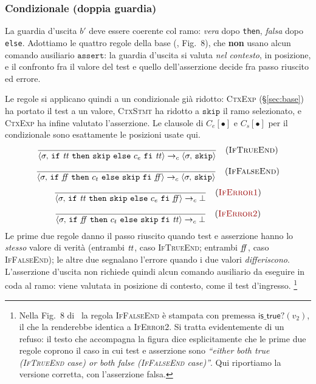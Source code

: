 \subsubsection{Condizionale (doppia guardia)}
\label{sec:if}
La guardia d'uscita $b'$ deve essere coerente col ramo: \emph{vera} dopo
\texttt{then}, \emph{falsa} dopo \texttt{else}. Adottiamo le quattro regole
della base (\cite{LamiLaneseStefani2024}, Fig.~8), che \textbf{non} usano
alcun comando ausiliario $\mathtt{assert}$: la guardia d'uscita si valuta
\emph{nel contesto}, in posizione, e il confronto fra il valore del test e
quello dell'asserzione decide fra passo riuscito ed errore.

\medskip
\noindent
Le regole si applicano quindi a un condizionale già ridotto: \textsc{CtxExp}
(\S\ref{sec:base}) ha portato il test a un valore, \textsc{CtxStmt} ha ridotto
a $\mathtt{skip}$ il ramo selezionato, e \textsc{CtxExp} ha infine valutato
l'asserzione. Le clausole di $C_e[\bullet]$ e $C_s[\bullet]$ per il
condizionale sono esattamente le posizioni usate qui.
\[
\dfrac{}{\cfg{\mathtt{if}\ \ttt\ \mathtt{then}\ \mathtt{skip}\ \mathtt{else}\ c_e\ \mathtt{fi}\ \ttt}{\sigma}
       \toc \cfg{\mathtt{skip}}{\sigma}} \rname{IfTrueEnd}
\]
\[
\dfrac{}{\cfg{\mathtt{if}\ \ff\ \mathtt{then}\ c_t\ \mathtt{else}\ \mathtt{skip}\ \mathtt{fi}\ \ff}{\sigma}
       \toc \cfg{\mathtt{skip}}{\sigma}} \rname{IfFalseEnd}
\]
\[
\dfrac{}{\cfg{\mathtt{if}\ \ttt\ \mathtt{then}\ \mathtt{skip}\ \mathtt{else}\ c_e\ \mathtt{fi}\ \ff}{\sigma}
       \toc \bot} \rnameerr{IfError1}
\]
\[
\dfrac{}{\cfg{\mathtt{if}\ \ff\ \mathtt{then}\ c_t\ \mathtt{else}\ \mathtt{skip}\ \mathtt{fi}\ \ttt}{\sigma}
       \toc \bot} \rnameerr{IfError2}
\]
Le prime due regole danno il passo riuscito quando test e asserzione hanno lo
\emph{stesso} valore di verità (entrambi $\mathit{tt}$, caso \textsc{IfTrueEnd};
entrambi $\mathit{ff}$, caso \textsc{IfFalseEnd}); le altre due segnalano l'errore
quando i due valori \emph{differiscono}. L'asserzione d'uscita non
richiede quindi alcun comando ausiliario da eseguire in coda al ramo: viene
valutata in posizione di contesto, come il test d'ingresso.%
\footnote{Nella Fig.~8 di~\cite{LamiLaneseStefani2024} la regola
\textsc{IfFalseEnd} è stampata con premessa $\mathsf{is\_true?}(v_2)$, il che
la renderebbe identica a \textsc{IfError2}. Si tratta evidentemente di un
refuso: il testo che accompagna la figura dice esplicitamente che le prime due
regole coprono il caso in cui test e asserzione sono \emph{``either both true
\textup{(\textsc{IfTrueEnd}} case\textup{)} or both false
\textup{(\textsc{IfFalseEnd}} case\textup{)}''}. Qui riportiamo la versione
corretta, con l'asserzione falsa.}

